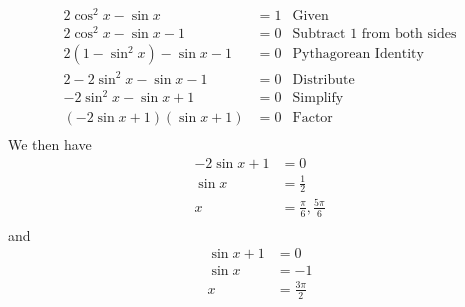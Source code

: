 \documentclass[11pt]{article}
\begin{document}
\begin{align*}
    2\cos^2{x} - \sin{x} &= 1 & \text{Given} \\
    2\cos^2{x} - \sin{x} - 1 &= 0 & \text{Subtract 1 from both sides} \\
    2(1 - \sin^2{x}) - \sin{x} - 1 &= 0 & \text{Pythagorean Identity} \\
    2 - 2\sin^2{x} - \sin{x} - 1 &= 0 & \text{Distribute} \\
    -2\sin^2{x} - \sin{x} + 1 &= 0 & \text{Simplify} \\
    (-2\sin{x} + 1)(\sin{x} + 1) &= 0 & \text{Factor} \\
\end{align*}
We then have
\begin{align*}
    -2\sin{x} + 1 &= 0 \\
    \sin{x} &= \frac{1}{2} \\
    x &= \frac{\pi}{6}, \frac{5\pi}{6} \\
\end{align*}
and
\begin{align*}
    \sin{x} + 1 &= 0 \\
    \sin{x} &= - 1 \\
    x &= \frac{3\pi}{2} \\
\end{align*}
\end{document}
